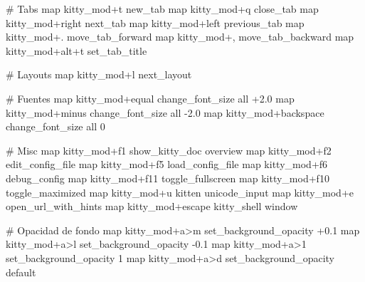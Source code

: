 \documentclass[
  doc,
  floatsintext,
  longtable,
  a4paper,
  nolmodern,
  notxfonts,
  notimes,
  12pt,
  colorlinks=true,linkcolor=blue,citecolor=blue,urlcolor=blue]{apa7}
\newenvironment{Shaded}{\begin{snugshade}}{\end{snugshade}}
\newcommand{\CommentTok}[1]{\textcolor[rgb]{0.37,0.37,0.37}{#1}}
\newcommand{\DataTypeTok}[1]{\textcolor[rgb]{0.68,0.00,0.00}{#1}}
\newcommand{\ErrorTok}[1]{\textcolor[rgb]{0.68,0.00,0.00}{#1}}
\begin{document}
\begin{Shaded}
\begin{Highlighting}[]
\CommentTok{\# Tabs}
\DataTypeTok{map} \DataTypeTok{kitty\_mod}\ErrorTok{+}\DataTypeTok{t} \DataTypeTok{new\_tab}
\DataTypeTok{map} \DataTypeTok{kitty\_mod}\ErrorTok{+}\DataTypeTok{q} \DataTypeTok{close\_tab}
\DataTypeTok{map} \DataTypeTok{kitty\_mod}\ErrorTok{+}\DataTypeTok{right} \DataTypeTok{next\_tab}
\DataTypeTok{map} \DataTypeTok{kitty\_mod}\ErrorTok{+}\DataTypeTok{left} \DataTypeTok{previous\_tab}
\DataTypeTok{map} \DataTypeTok{kitty\_mod}\ErrorTok{+}\DataTypeTok{.} \DataTypeTok{move\_tab\_forward}
\DataTypeTok{map} \DataTypeTok{kitty\_mod}\ErrorTok{+,} \DataTypeTok{move\_tab\_backward}
\DataTypeTok{map} \DataTypeTok{kitty\_mod}\ErrorTok{+}\DataTypeTok{alt}\ErrorTok{+}\DataTypeTok{t} \DataTypeTok{set\_tab\_title}

\CommentTok{\# Layouts}
\DataTypeTok{map} \DataTypeTok{kitty\_mod}\ErrorTok{+}\DataTypeTok{l} \DataTypeTok{next\_layout}

\CommentTok{\# Fuentes}
\DataTypeTok{map} \DataTypeTok{kitty\_mod}\ErrorTok{+}\DataTypeTok{equal} \DataTypeTok{change\_font\_size} \DataTypeTok{all} \ErrorTok{+}\DataTypeTok{2.0}
\DataTypeTok{map} \DataTypeTok{kitty\_mod}\ErrorTok{+}\DataTypeTok{minus} \DataTypeTok{change\_font\_size} \DataTypeTok{all} \DataTypeTok{{-}2.0}
\DataTypeTok{map} \DataTypeTok{kitty\_mod}\ErrorTok{+}\DataTypeTok{backspace} \DataTypeTok{change\_font\_size} \DataTypeTok{all} \DataTypeTok{0}

\CommentTok{\# Misc}
\DataTypeTok{map} \DataTypeTok{kitty\_mod}\ErrorTok{+}\DataTypeTok{f1} \DataTypeTok{show\_kitty\_doc} \DataTypeTok{overview}
\DataTypeTok{map} \DataTypeTok{kitty\_mod}\ErrorTok{+}\DataTypeTok{f2} \DataTypeTok{edit\_config\_file}
\DataTypeTok{map} \DataTypeTok{kitty\_mod}\ErrorTok{+}\DataTypeTok{f5} \DataTypeTok{load\_config\_file}
\DataTypeTok{map} \DataTypeTok{kitty\_mod}\ErrorTok{+}\DataTypeTok{f6} \DataTypeTok{debug\_config}
\DataTypeTok{map} \DataTypeTok{kitty\_mod}\ErrorTok{+}\DataTypeTok{f11} \DataTypeTok{toggle\_fullscreen}
\DataTypeTok{map} \DataTypeTok{kitty\_mod}\ErrorTok{+}\DataTypeTok{f10} \DataTypeTok{toggle\_maximized}
\DataTypeTok{map} \DataTypeTok{kitty\_mod}\ErrorTok{+}\DataTypeTok{u} \DataTypeTok{kitten} \DataTypeTok{unicode\_input}
\DataTypeTok{map} \DataTypeTok{kitty\_mod}\ErrorTok{+}\DataTypeTok{e} \DataTypeTok{open\_url\_with\_hints}
\DataTypeTok{map} \DataTypeTok{kitty\_mod}\ErrorTok{+}\DataTypeTok{escape} \DataTypeTok{kitty\_shell} \DataTypeTok{window}

\CommentTok{\# Opacidad de fondo}
\DataTypeTok{map} \DataTypeTok{kitty\_mod}\ErrorTok{+}\DataTypeTok{a}\ErrorTok{\textgreater{}}\DataTypeTok{m} \DataTypeTok{set\_background\_opacity} \ErrorTok{+}\DataTypeTok{0.1}
\DataTypeTok{map} \DataTypeTok{kitty\_mod}\ErrorTok{+}\DataTypeTok{a}\ErrorTok{\textgreater{}}\DataTypeTok{l} \DataTypeTok{set\_background\_opacity} \DataTypeTok{{-}0.1}
\DataTypeTok{map} \DataTypeTok{kitty\_mod}\ErrorTok{+}\DataTypeTok{a}\ErrorTok{\textgreater{}}\DataTypeTok{1} \DataTypeTok{set\_background\_opacity} \DataTypeTok{1}
\DataTypeTok{map} \DataTypeTok{kitty\_mod}\ErrorTok{+}\DataTypeTok{a}\ErrorTok{\textgreater{}}\DataTypeTok{d} \DataTypeTok{set\_background\_opacity} \DataTypeTok{default}


\end{Highlighting}
\end{Shaded}
\end{document}
